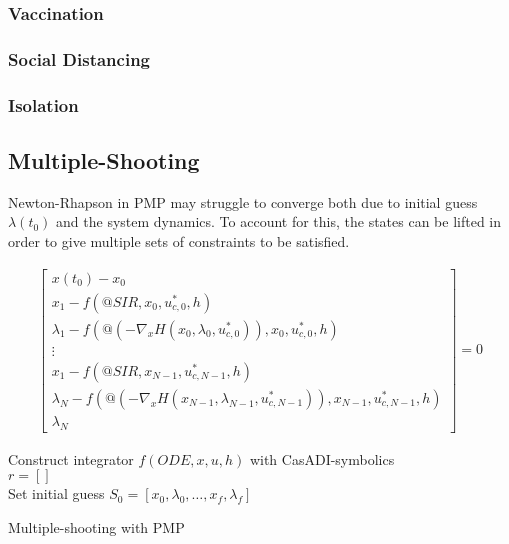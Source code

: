 \subsubsection{Vaccination}
\subsubsection{Social Distancing}
\subsubsection{Isolation}

\subsection{Multiple-Shooting}
Newton-Rhapson in PMP may struggle to converge both due to initial guess $\lambda(t_0)$ and the system dynamics. To account for this, the states can be lifted in order to give multiple sets of constraints to be satisfied.

\begin{align}
    \begin{bmatrix}
    x(t_0) - x_0\\
    x_1 - f(@SIR, x_0, u^*_{c, 0}, h)\\
    \lambda_1 - f(@(-\nabla_xH(x_0, \lambda_0, u^*_{c,0})), x_0, u^*_{c,0}, h)\\
    \vdots\\
    x_1 - f(@SIR, x_{N-1}, u^*_{c, N-1}, h)\\
    \lambda_N - f(@(-\nabla_xH(x_{N-1}, \lambda_{N-1}, u^*_{c,{N-1}})), x_{N-1}, u^*_{c,N-1}, h)\\
    \lambda_N
    \end{bmatrix} = 0
\end{align}

\begin{algorithm}[H]
\SetAlgoLined
{}
Construct integrator $f(ODE, x, u, h)$ with CasADI-symbolics\\

$r = []$\\
 Set initial guess $S_0 = [x_0, \lambda_0, \dots, x_f, \lambda_f]$\\
 \caption{Multiple-shooting with PMP}
 \label{alg:Multiple_Shooting_Integration_PMP}
\end{algorithm}

